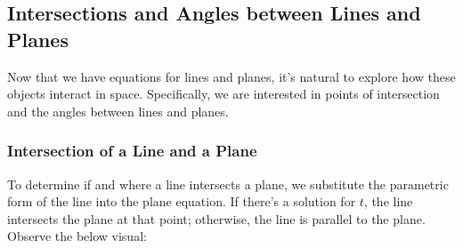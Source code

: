 \subsection*{Intersections and Angles between Lines and Planes}

\noindent Now that we have equations for lines and planes, it’s natural to explore how these objects interact in space. Specifically, we are interested in points of intersection and the angles between lines and planes.

\subsubsection*{Intersection of a Line and a Plane}

\noindent To determine if and where a line intersects a plane, we substitute the parametric form of the line into the plane equation. If there’s a solution for \( t \), the line intersects the plane at that point; otherwise, the line is parallel to the plane. Observe the below visual:


